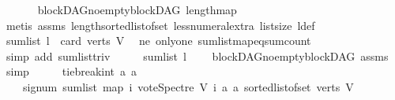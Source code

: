 \begin{isabellebody}
\ \ \ \ \isamarkupfalse%
\ \ blockDAG{\isachardot}{\kern0pt}no{\isacharunderscore}{\kern0pt}empty{\isacharunderscore}{\kern0pt}blockDAG\ length{\isacharunderscore}{\kern0pt}map\isanewline
\ \ \ \ \isamarkupfalse%
\ {\isacharparenleft}{\kern0pt}metis\ assms{\isacharparenleft}{\kern0pt}{}{\isacharparenright}{\kern0pt}\ length{\isacharunderscore}{\kern0pt}sorted{\isacharunderscore}{\kern0pt}list{\isacharunderscore}{\kern0pt}of{\isacharunderscore}{\kern0pt}set\ less{\isacharunderscore}{\kern0pt}numeral{\isacharunderscore}{\kern0pt}extra{\isacharparenleft}{\kern0pt}{}{\isacharparenright}{\kern0pt}\ list{\isachardot}{\kern0pt}size{\isacharparenleft}{\kern0pt}{}{\isacharparenright}{\kern0pt}\ l{\isacharunderscore}{\kern0pt}def{\isacharparenright}{\kern0pt}\isanewline
\ \ \isamarkupfalse%
\ {\isachardoublequoteopen}sum{\isacharunderscore}{\kern0pt}list\ l\ {\isacharequal}{\kern0pt}\ card\ {\isacharparenleft}{\kern0pt}verts\ V{\isacharparenright}{\kern0pt}{\isachardoublequoteclose}\ \isamarkupfalse%
\ ne\ only{\isacharunderscore}{\kern0pt}one\ sum{\isacharunderscore}{\kern0pt}list{\isacharunderscore}{\kern0pt}map{\isacharunderscore}{\kern0pt}eq{\isacharunderscore}{\kern0pt}sum{\isacharunderscore}{\kern0pt}count\isanewline
\ \ \ \ \isamarkupfalse%
\ {\isacharparenleft}{\kern0pt}simp\ add{\isacharcolon}{\kern0pt}\ sum{\isacharunderscore}{\kern0pt}list{\isacharunderscore}{\kern0pt}triv{\isacharparenright}{\kern0pt}\isanewline
\ \ \isamarkupfalse%
\ \isamarkupfalse%
\ {\isachardoublequoteopen}sum{\isacharunderscore}{\kern0pt}list\ l\ {\isachargreater}{\kern0pt}\ {}{\isachardoublequoteclose}\ \isamarkupfalse%
\ blockDAG{\isachardot}{\kern0pt}no{\isacharunderscore}{\kern0pt}empty{\isacharunderscore}{\kern0pt}blockDAG\ assms{\isacharparenleft}{\kern0pt}{}{\isacharparenright}{\kern0pt}\ \isamarkupfalse%
\ simp\isanewline
\ \ \isamarkupfalse%
\ \isamarkupfalse%
\ {\isachardoublequoteopen}tie{\isacharunderscore}{\kern0pt}break{\isacharunderscore}{\kern0pt}int\ a\ a\isanewline
\ \ \ \ {\isacharparenleft}{\kern0pt}signum\ {\isacharparenleft}{\kern0pt}sum{\isacharunderscore}{\kern0pt}list\ {\isacharparenleft}{\kern0pt}map\ {\isacharparenleft}{\kern0pt}{\isasymlambda}i{\isachardot}{\kern0pt}\ vote{\isacharunderscore}{\kern0pt}Spectre\ V\ i\ a\ a{\isacharparenright}{\kern0pt}\ {\isacharparenleft}{\kern0pt}sorted{\isacharunderscore}{\kern0pt}list{\isacharunderscore}{\kern0pt}of{\isacharunderscore}{\kern0pt}set\ {\isacharparenleft}{\kern0pt}verts\ V{\isacharparenright}{\kern0pt}{\isacharparenright}{\kern0pt}{\isacharparenright}{\kern0pt}{\isacharparenright}{\kern0pt}{\isacharparenright}{\kern0pt}\ {\isacharequal}{\kern0pt}\ {}{\isachardoublequoteclose}\isanewline

\end{isabellebody}
